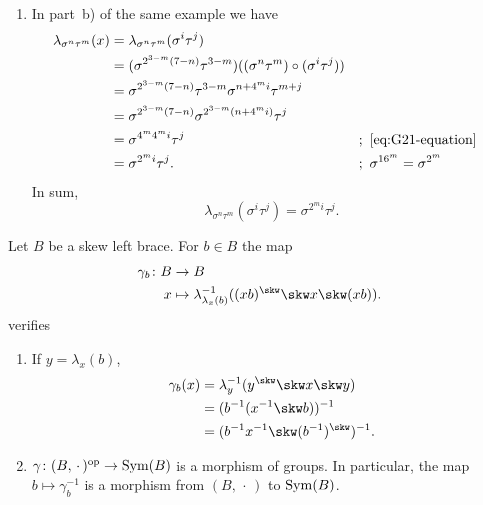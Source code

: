 \begin{xmpls}
\begin{enumerate}[\rm a)]
        \item In part~b) of the same example we have
        \begin{align*}
            \lambda_{\sigma^n\tau^m}(x)
                &=\lambda_{\sigma^n\tau^m}(\sigma^i\tau^j)\\
                &= (\sigma^{2^{3-m}(7-n)}\tau^{3-m})
                    ((\sigma^n\tau^m)\circ(\sigma^i\tau^j))\\
                &=  \sigma^{2^{3-m}(7-n)}\tau^{3-m}
                    \sigma^{n+4^mi}\tau^{m+j}\\
                &= \sigma^{2^{3-m}(7-n)}\sigma^{2^{3-m}
                    (n+4^mi)}\tau^j\\
                &= \sigma^{4^m4^mi}\tau^j
                    &&;\ \eqref{eq:G21-equation}\\
                &= \sigma^{2^mi}\tau^j.
                    &&;\ \sigma^{16^m}=\sigma^{2^m}
        \end{align*}
        In sum,
        \begin{equation}\label{eq:lambda-21}
            \lambda_{\sigma^n\tau^m}(\sigma^i\tau^j)
                = \sigma^{2^mi}\tau^j.
        \end{equation}
    \end{enumerate}
\end{xmpls}

\begin{lem}\label{lem:ybe-gamma}
    Let $B$ be a skew left brace. For $b\in B$ the map
    \begin{align*}
        \gamma_b\colon B&\to B\\
        x&\mapsto \lambda^{-1}_{\lambda_x(b)}((xb)^\skw\skw x\skw(xb)).
    \end{align*}
    verifies
    \begin{enumerate}[\rm a)]
        \item If $y=\lambda_x(b)$,
            \begin{align}
                \gamma_b(x) &= \lambda^{-1}_y(y^\skw\skw x\skw y)
                        \label{eq:gamma-alt-1}\\
                    &= (b^{-1}(x^{-1}\skw b))^{-1}
                        \label{eq:gamma-alt-2}\\
                    &= (b^{-1}x^{-1}\skw(b^{-1})^\skw)^{-1}.
                        \label{eq:gamma-alt-3}
            \end{align}

            \item $\gamma\colon(B,\,\cdot\,)^{\operatorname{op}}\to{\rm Sym}(B)$ is a morphism of groups. In particular, the map $b\mapsto\gamma_b^{-1}$ is a morphism from $(B,\,\cdot\,)$ to ${\rm Sym}(B)$.
    \end{enumerate}
\end{lem}

